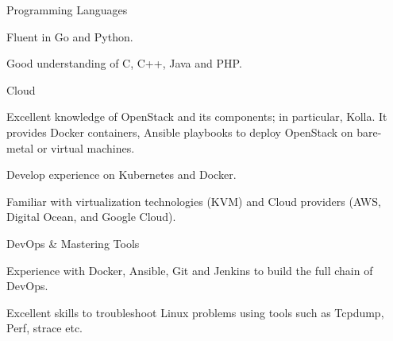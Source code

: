 \begin{cventries}
  \cventry
    {Programming Languages}
    {}
    {}
    {}
    {
      \begin{cvitems}
        \item {Fluent in Go and Python.}
        \item {Good understanding of C, C++, Java and PHP.}
      \end{cvitems}
    }
    \cventry
    {Cloud}
    {}
    {}
    {}
    {
      \begin{cvitems}
        \item {Excellent knowledge of OpenStack and its components; in particular, Kolla. It provides Docker containers, Ansible playbooks to deploy OpenStack on bare-metal or virtual machines.}
        \item {Develop experience on Kubernetes and Docker.}
        \item {Familiar with virtualization technologies (KVM) and Cloud providers (AWS, Digital Ocean, and Google Cloud).}
      \end{cvitems}
    }

    \cventry
    {DevOps \& Mastering Tools}
    {}
    {}
    {}
    {
      \begin{cvitems}
        \item {Experience with Docker, Ansible, Git and Jenkins to build the full chain of DevOps.}
        \item {Excellent skills to troubleshoot Linux problems using tools such as Tcpdump, Perf, strace etc.}
      \end{cvitems}
    }
    
\end{cventries}

